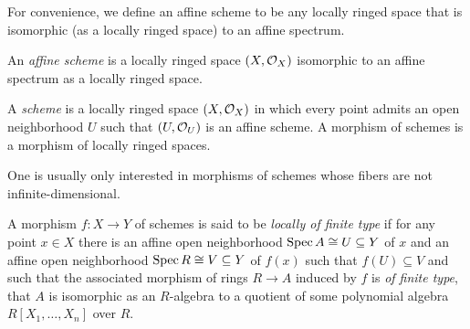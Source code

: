 
For convenience, we define an affine scheme to be any locally ringed space that is isomorphic (as a locally ringed space) to an affine spectrum.
\begin{definition}
	
	An \emph{affine scheme} is a locally ringed space $(X, {{\mathcal{O}}_{X}})$ isomorphic to an affine spectrum as a locally ringed space.
\end{definition}

\begin{definition}
	
	A \emph{scheme} is a locally ringed space $(X, {{\mathcal{O}}_{X}})$ in which every point admits an open neighborhood $U$ such that $(U, {{\mathcal{O}}_{U}})$ is an affine scheme. A morphism of schemes is a morphism of locally ringed spaces.
\end{definition}

One is usually only interested in morphisms of schemes whose fibers are not infinite-dimensional.
\begin{definition}
	\label{definition: being locally of finite type}
	
	A morphism $f\colon X\to Y$ of schemes is said to be \emph{locally of finite type} if for any point $x\in X$ there is an affine open neighborhood $\operatorname{Spec} A\cong U\subseteq Y$ of $x$ and an affine open neighborhood $\operatorname{Spec} R\cong V\subseteq Y$ of $f(x)$ such that $f(U)\subseteq V$ and such that the associated morphism of rings $R\to A$ induced by $f$ is \emph{of finite type}, \ie that $A$ is isomorphic as an $R$-algebra to a quotient of some polynomial algebra $R[X_1,\dots, X_n]$ over $R$.
\end{definition}


